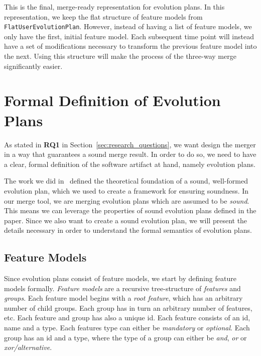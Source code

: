 \documentclass[a4paper,english]{ifimaster}
\begin{document}
This is the final, merge-ready representation for evolution plans. In this representation, we keep the flat structure of feature models from \texttt{Flat\-User\-Evolution\-Plan}. However, instead of having a list of feature models, we only have the first, initial feature model. Each subsequent time point will instead have a set of modifications necessary to transform the previous feature model into the next. Using this structure will make the process of the three-way merge significantly easier.

\section{Formal Definition of Evolution Plans}%
\label{sec:formal_definition_of_evolution_plans}

As stated in \textbf{RQ1} in Section~\vref{sec:research_questions}, we want design the merger in a way that guarantees a sound merge result. In order to do so, we need to have a clear, formal definition of the software artifact at hand, namely evolution plans.

The work we did in~\cite{cite:consistency_preserving_evolution_planning} defined the theoretical foundation of a sound, well-formed evolution plan, which we used to create a framework for ensuring soundness. In our merge tool, we are merging evolution plans which are assumed to be \textit{sound}. This means we can leverage the properties of sound evolution plans defined in the paper. Since we also want to create a sound evolution plan, we will present the details necessary in order to understand the formal semantics of evolution plans.

\subsection{Feature Models}%
\label{sub:feature_models}

Since evolution plans consist of feature models, we start by defining feature models formally. \textit{Feature models} are a recursive tree-structure of \textit{features} and \textit{groups}. Each feature model begins with a \textit{root feature}, which has an arbitrary number of child groups. Each group has in turn an arbitrary number of features, etc. Each feature and group has also a unique id. Each feature consists of an id, name and a type. Each features type can either be \textit{mandatory} or \textit{optional}. Each group has an id and a type, where the type of a group can either be \textit{and}, \textit{or} or \textit{xor/alternative}.
\end{document}
